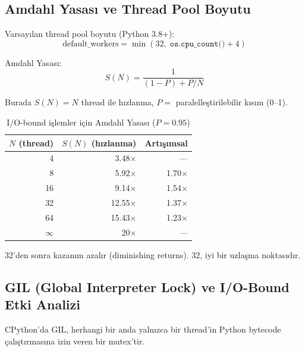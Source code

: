 \subsection{Amdahl Yasas{\i} ve Thread Pool Boyutu}
\label{sec:amdahl}

Varsay{\i}lan thread pool boyutu (Python 3.8+):
\begin{equation}
\label{eq:default-workers}
\text{default\_workers} = \min(32, \;\texttt{os.cpu\_count()} + 4)
\end{equation}

Amdahl Yasas{\i}:
\begin{equation}
\label{eq:amdahl}
S(N) = \frac{1}{(1 - P) + P/N}
\end{equation}

Burada $S(N) = N$ thread ile h{\i}zlanma, $P =$ paralelle\c{s}tirilebilir k{\i}s{\i}m (0--1).

\begin{table}[H]
\centering
\caption{I/O-bound i\c{s}lemler i\c{c}in Amdahl Yasas{\i} ($P = 0.95$)}
\label{tab:amdahl}
\begin{tabularx}{0.7\textwidth}{rrr}
\toprule
\color{chapterBlue}\textbf{$N$ (thread)} & \color{chapterBlue}\textbf{$S(N)$ (h{\i}zlanma)} & \color{chapterBlue}\textbf{Art{\i}\c{s}{\i}msal} \\
\midrule
4   & 3.48$\times$  & --- \\
8   & 5.92$\times$  & 1.70$\times$ \\
16  & 9.14$\times$  & 1.54$\times$ \\
32  & 12.55$\times$ & 1.37$\times$ \\
64  & 15.43$\times$ & 1.23$\times$ \\
$\infty$ & 20$\times$ & --- \\
\bottomrule
\end{tabularx}
\end{table}

32'den sonra kazan{\i}m azal{\i}r (diminishing returns). 32, iyi bir uzla\c{s}ma noktas{\i}d{\i}r.

\subsection{GIL (Global Interpreter Lock) ve I/O-Bound Etki Analizi}
\label{sec:gil}

CPython'da GIL, herhangi bir anda yaln{\i}zca bir thread'in Python bytecode \c{c}al{\i}\c{s}t{\i}rmas{\i}na izin veren bir mutex'tir.

